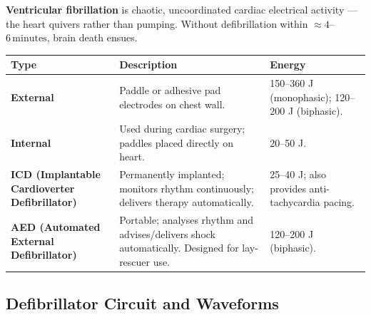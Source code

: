 \documentclass[12pt,a4paper]{article}
\begin{document}
\textbf{Ventricular fibrillation} is chaotic, uncoordinated cardiac electrical activity --- the heart quivers rather than pumping. Without defibrillation within $\approx 4$--$6\,\text{minutes}$, brain death ensues.

\par\noindent
\begin{tabularx}{\linewidth}{|B{3.0cm}|Y|Y|}
\hline
\textbf{Type} & \textbf{\color{myteal}Description} & \textbf{\color{mygreen}Energy} \\
\hline
\textbf{External} & Paddle or adhesive pad electrodes on chest wall. & 150--360 J (monophasic); 120--200 J (biphasic). \\
\hline
\textbf{Internal} & Used during cardiac surgery; paddles placed directly on heart. & 20--50 J. \\
\hline
\textbf{ICD (Implantable Cardioverter Defibrillator)} & Permanently implanted; monitors rhythm continuously; delivers therapy automatically. & 25--40 J; also provides anti-tachycardia pacing. \\
\hline
\textbf{AED (Automated External Defibrillator)} & Portable; analyses rhythm and advises/delivers shock automatically. Designed for lay-rescuer use. & 120--200 J (biphasic). \\
\hline
\end{tabularx}

\subsection{Defibrillator Circuit and Waveforms}
\end{document}
